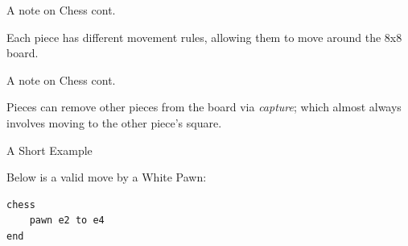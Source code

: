 \documentclass{beamer}
\begin{document}
\begin{frame}{A note on Chess cont.}

Each piece has different movement rules, allowing them to move around the 8x8 board.
    
\begin{figure}[h]
    \centering
    \newgame
    \scalebox{0.60}{\showboard}
    \quad
    \scalebox{0.60}{\showboard}
    \label{demonstratemovement}
\end{figure}
    
\end{frame}

\begin{frame}{A note on Chess cont.}

Pieces can remove other pieces from the board via \emph{capture}; which almost always involves moving to the other piece's square.

\begin{figure}[h]
    \centering
    \scalebox{0.60}{\showboard}
    \quad
    \scalebox{0.60}{\showboard}
    \label{demonstratecapture}
\end{figure}

\end{frame}

\begin{frame}[fragile]{A Short Example}

Below is a valid move by a White Pawn:

\begin{figure}[h]
    \centering
    \newgame
    \scalebox{0.55}{\showboard}
    \quad
    \scalebox{0.55}{\showboard}
    \label{validpawnmove}
\end{figure}

\pause

\begin{lstlisting}
chess
    pawn e2 to e4
end
\end{lstlisting}

\end{frame}
\end{document}
